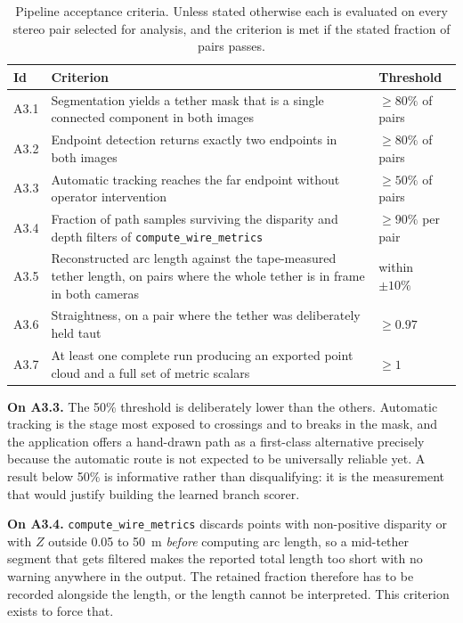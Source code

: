 \begin{table}[htbp]
\centering
\caption[Pipeline acceptance criteria]{Pipeline acceptance criteria. Unless
stated otherwise each is evaluated on every stereo pair selected for analysis,
and the criterion is met if the stated fraction of pairs passes.}
\label{tab:crit-pipeline}
\begin{tabularx}{\textwidth}{@{}l X l@{}}
\toprule
\textbf{Id} & \textbf{Criterion} & \textbf{Threshold} \\
\midrule
A3.1 & Segmentation yields a tether mask that is a single connected component
       in both images & $\geq 80\%$ of pairs \\
A3.2 & Endpoint detection returns exactly two endpoints in both images &
       $\geq 80\%$ of pairs \\
A3.3 & Automatic tracking reaches the far endpoint without operator
       intervention & $\geq 50\%$ of pairs \\
A3.4 & Fraction of path samples surviving the disparity and depth filters of
       \texttt{compute\_wire\_metrics} & $\geq 90\%$ per pair \\
A3.5 & Reconstructed arc length against the tape-measured tether length, on
       pairs where the whole tether is in frame in both cameras &
       within $\pm 10\%$ \\
A3.6 & Straightness, on a pair where the tether was deliberately held taut &
       $\geq 0.97$ \\
A3.7 & At least one complete run producing an exported point cloud and a full
       set of metric scalars & $\geq 1$ \\
\bottomrule
\end{tabularx}
\end{table}

\textbf{On A3.3.} The 50\% threshold is deliberately lower than the others.
Automatic tracking is the stage most exposed to crossings and to breaks in the
mask, and the application offers a hand-drawn path as a first-class
alternative precisely because the automatic route is not expected to be
universally reliable yet. A result below 50\% is informative rather than
disqualifying: it is the measurement that would justify building the learned
branch scorer.

\textbf{On A3.4.} \texttt{compute\_wire\_metrics} discards points with
non-positive disparity or with $Z$ outside 0.05 to 50~m \emph{before}
computing arc length, so a mid-tether segment that gets filtered makes the
reported total length too short with no warning anywhere in the output. The
retained fraction therefore has to be recorded alongside the length, or the
length cannot be interpreted. This criterion exists to force that.

